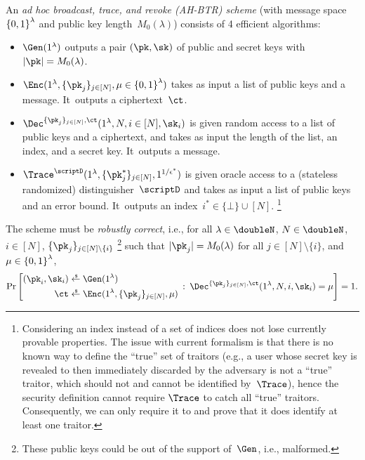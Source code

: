 \begin{definition}[AH-BTR]\label{def:ahbtr}
An \emph{ad hoc broadcast, trace, and revoke (AH-BTR) scheme}
(with message space~${\{0,1\}}^\lambda$ and public key length~$M_0(\lambda)$)
consists of 4 efficient algorithms:
\begin{itemize}
\item $\Gen(1^\lambda)$ outputs a pair $(\pk,\sk)$ of public and secret keys
with ${|\pk|=M_0(\lambda)}$.
\item $\Enc(1^\lambda,\{\pk_j\}_{j\in[N]},{\mu\in\bit^\lambda})$
takes as input
a list of public keys and a message.
It~outputs a ciphertext~$\ct$.
\item $\Dec^{\{\pk_j\}_{j\in[N]},\ct}(1^\lambda,N,i\in[N],\sk_i)$
is given random access to a list of public keys and a ciphertext, and
takes as input
the length of the list,
an index, and
a secret key.
It~outputs a message.
\item $\Trace^\scriptD(1^\lambda,\{\pk^\ast_j\}_{j\in[N]},1^{1/\epsilon^\ast})$
is given oracle access to a (stateless randomized) distinguisher~$\scriptD$ and takes as input
a list of public keys and an error bound.
It~outputs an index~${i^\ast\in\{\bot\}\cup[N]}$.%
\footnote{Considering an index instead of a set of indices
does not lose currently provable properties.
The issue with current formalism is that
there is no known way to define the ``true'' set of traitors
(e.g., a user whose secret key is
revealed to then immediately discarded by the adversary
is not a ``true'' traitor,
which should not and cannot be identified by~$\Trace$),
hence the security definition cannot require $\Trace$
to catch all ``true'' traitors.
Consequently, we can only require it to and prove that it does
identify at least one traitor.
}
\end{itemize}
The scheme must be \emph{robustly correct}, i.e., for all
${\lambda\in\doubleN}$,
${N\in\doubleN}$,
${i\in[N]}$,\WideNarrow{}{\linebreak[4]}
$\{\pk_j\}_{j\in[N]\setminus\{i\}}$%
\footnote{These public keys could be out of the support of~$\Gen$,
i.e., malformed.}
such that ${|\pk_j|=M_0(\lambda)}$ for all ${j\in[N]\setminus\{i\}}$, and
${\mu\in{\{0,1\}}^\lambda}$,
\begin{align*}
\Pr\left[
\begin{aligned}
(\pk_i,\sk_i)&{}\draws\Gen(1^\lambda)\\
\ct&{}\draws\Enc(1^\lambda,\{\pk_j\}_{j\in[N]},\mu)
\end{aligned}
\::\:
\Dec^{\{\pk_j\}_{j\in[N]},\ct}(1^\lambda,N,i,\sk_i)=\mu
\right]=1.
\end{align*}
\end{definition}
